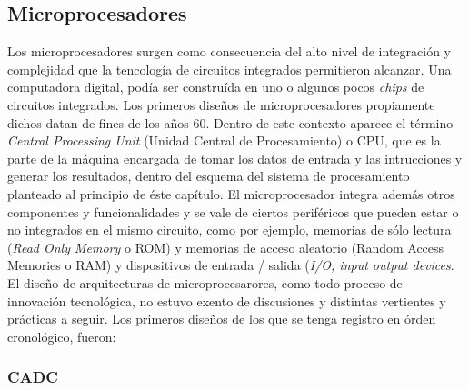 \subsection{Microprocesadores}

Los microprocesadores surgen como consecuencia del alto nivel de integración y complejidad que la tencología de circuitos integrados permitieron alcanzar. Una computadora digital, podía ser construída en uno o algunos pocos \emph{chips} de circuitos integrados. Los primeros diseños de microprocesadores propiamente dichos datan de fines de los años 60. Dentro de este contexto aparece el término \emph{Central Processing Unit} (Unidad Central de Procesamiento) o CPU, que es la parte de la máquina encargada de tomar los datos de entrada y las intrucciones y generar los resultados, dentro del esquema del sistema de procesamiento planteado al principio de éste capítulo. El microprocesador integra además otros componentes y funcionalidades y se vale de ciertos periféricos que pueden estar o no integrados en el mismo circuito, como por ejemplo, memorias de sólo lectura (\emph{Read Only Memory} o ROM) y memorias de acceso aleatorio (Random Access Memories o RAM) y dispositivos de entrada / salida (\emph{I/O, input output devices}. El diseño de arquitecturas de microprocesarores, como todo proceso de innovación tecnológica, no estuvo exento de discusiones y distintas vertientes y prácticas a seguir. Los primeros diseños de los que se tenga registro en órden cronológico, fueron:

\subsubsection{CADC}


